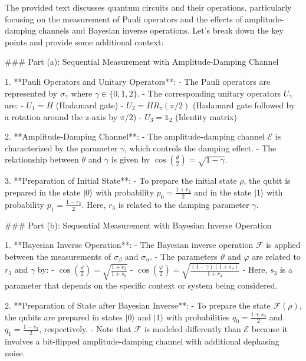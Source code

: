 The provided text discusses quantum circuits and their operations, particularly focusing on the measurement of Pauli operators and the effects of amplitude-damping channels and Bayesian inverse operations. Let's break down the key points and provide some additional context:

### Part (a): Sequential Measurement with Amplitude-Damping Channel

1. **Pauli Operators and Unitary Operators**:
   - The Pauli operators are represented by \(\sigma_\gamma\) where \(\gamma \in \{0, 1, 2\}\).
   - The corresponding unitary operators \(U_\gamma\) are:
     - \(U_1 = H\) (Hadamard gate)
     - \(U_2 = HR_z(\pi/2)\) (Hadamard gate followed by a rotation around the z-axis by \(\pi/2\))
     - \(U_3 = \mathds{1}_2\) (Identity matrix)

2. **Amplitude-Damping Channel**:
   - The amplitude-damping channel \(\mathcal{E}\) is characterized by the parameter \(\gamma\), which controls the damping effect.
   - The relationship between \(\theta\) and \(\gamma\) is given by \(\cos\left(\frac{\theta}{2}\right) = \sqrt{1 - \gamma}\).

3. **Preparation of Initial State**:
   - To prepare the initial state \(\rho\), the qubit is prepared in the state \(|0\rangle\) with probability \(p_0 = \frac{1 + r_3}{2}\) and in the state \(|1\rangle\) with probability \(p_1 = \frac{1 - r_3}{2}\). Here, \(r_3\) is related to the damping parameter \(\gamma\).

### Part (b): Sequential Measurement with Bayesian Inverse Operation

1. **Bayesian Inverse Operation**:
   - The Bayesian inverse operation \(\mathcal{F}\) is applied between the measurements of \(\sigma_\beta\) and \(\sigma_\alpha\).
   - The parameters \(\vartheta\) and \(\varphi\) are related to \(r_3\) and \(\gamma\) by:
     - \(\cos\left(\frac{\vartheta}{2}\right) = \sqrt{\frac{1 + r_3}{1 + s_3}}\)
     - \(\cos\left(\frac{\varphi}{2}\right) = \sqrt{\frac{(1 - \gamma)(1 + s_3)}{1 + r_3}}\)
   - Here, \(s_3\) is a parameter that depends on the specific context or system being considered.

2. **Preparation of State after Bayesian Inverse**:
   - To prepare the state \(\mathcal{F}(\rho)\), the qubits are prepared in states \(|0\rangle\) and \(|1\rangle\) with probabilities \(q_0 = \frac{1 + s_3}{2}\) and \(q_1 = \frac{1 - s_3}{2}\), respectively.
   - Note that \(\mathcal{F}\) is modeled differently than \(\mathcal{E}\) because it involves a bit-flipped amplitude-damping channel with additional dephasing noise.

